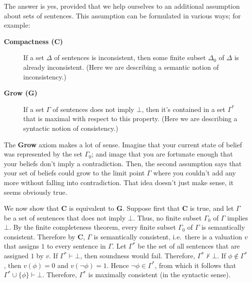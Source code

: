 The answer is yes, provided that we help ourselves to an additional
assumption about sets of sentences.  This assumption can be formulated
in various ways; for example:
\begin{description}
\item[\textbf{Compactness (C)}] If a set $\Delta$ of sentences is inconsistent,
  then some finite subset $\Delta _0$ of $\Delta$ is already
  inconsistent.  (Here we are describing a semantic notion of
  inconsistency.)
\item[\textbf{Grow (G)}] If a set $\Gamma$ of sentences does not imply
  $\bot$, then it's contained in a set $\Gamma ^*$ that is maximal
  with respect to this property.  (Here we are describing a syntactic
  notion of consistency.)
\end{description}
The \textbf{Grow} axiom makes a lot of sense.  Imagine that your
current state of belief was represented by the set $\Gamma _0$; and
image that you are fortunate enough that your beliefs don't imply a
contradiction.  Then, the second assumption says that your set of
beliefs could grow to the limit point $\Gamma$ where you couldn't add
any more without falling into contradiction.  That idea doesn't just
make sense, it seems obviously true.

We now show that \textbf{C} is equivalent to \textbf{G}.  Suppose
first that \textbf{C} is true, and let $\Gamma$ be a set of sentences
that does not imply $\bot$. Thus, no finite subset $\Gamma _0$ of
$\Gamma$ implies $\bot$.  By the finite completeness theorem, every
finite subset $\Gamma _0$ of $\Gamma$ is semantically consistent.
Therefore by \textbf{C}, $\Gamma$ is semantically consistent, i.e.\
there is a valuation $v$ that assigns $1$ to every sentence in
$\Gamma$.  Let $\Gamma ^*$ be the set of all sentences that are
assigned $1$ by $v$.  If $\Gamma ^*\vdash\bot$, then soundness would
fail.  Therefore, $\Gamma ^*\not\vdash\bot$.  If
$\phi\not\in\Gamma ^*$, then $v(\phi )=0$ and $v(\neg \phi )=1$.
Hence $\neg\phi\in\Gamma ^*$, from which it follows that
$\Gamma ^*\cup \{ \phi\}\vdash\bot$.  Therefore, $\Gamma ^*$ is
maximally consistent (in the syntactic sense).

